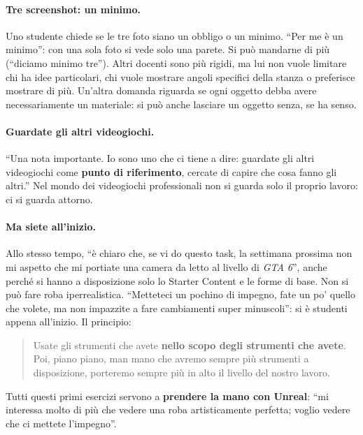 \paragraph{Tre screenshot: un minimo.} Uno studente chiede se le tre foto siano
un obbligo o un minimo. ``Per me è un minimo'': con una sola foto si vede solo
una parete. Si può mandarne di più (``diciamo minimo tre''). Altri docenti sono
più rigidi, ma lui non vuole limitare chi ha idee particolari, chi vuole
mostrare angoli specifici della stanza o preferisce mostrare di più. Un'altra
domanda riguarda se ogni oggetto debba avere necessariamente un materiale: si
può anche lasciare un oggetto senza, se ha senso.

\paragraph{Guardate gli altri videogiochi.} ``Una nota importante. Io sono uno
che ci tiene a dire: guardate gli altri videogiochi come \textbf{punto di
riferimento}, cercate di capire che cosa fanno gli altri.'' Nel mondo dei
videogiochi professionali non si guarda solo il proprio lavoro: ci si guarda
attorno.

\paragraph{Ma siete all'inizio.} Allo stesso tempo, ``è chiaro che, se vi do
questo task, la settimana prossima non mi aspetto che mi portiate una camera da
letto al livello di \emph{GTA 6}'', anche perché si hanno a disposizione solo
lo Starter Content e le forme di base. Non si può fare roba iperrealistica.
``Metteteci un pochino di impegno, fate un po' quello che volete, ma non
impazzite a fare cambiamenti super minuscoli'': si è studenti appena
all'inizio. Il principio:
\begin{quote}
Usate gli strumenti che avete \textbf{nello scopo degli strumenti che avete}.
Poi, piano piano, man mano che avremo sempre più strumenti a disposizione,
porteremo sempre più in alto il livello del nostro lavoro.
\end{quote}
Tutti questi primi esercizi servono a \textbf{prendere la mano con Unreal}: ``mi
interessa molto di più che vedere una roba artisticamente perfetta; voglio vedere
che ci mettete l'impegno''.

